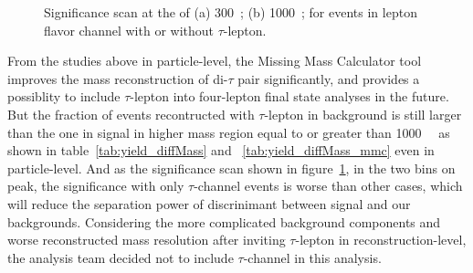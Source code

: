 \begin{figure}[!htbp]
\centering
{}
\caption{
Significance scan at the \mH of 
(a) 300~\gev;
(b) 1000~\gev;
for events in lepton flavor channel with or without $\tau$-lepton.
}
\label{fig:mmc_tau_signif}
\end{figure}

From the studies above in particle-level, the Missing Mass Calculator tool improves the mass reconstruction of di-$\tau$ pair significantly,
and provides a possiblity to include $\tau$-lepton into four-lepton final state analyses in the future.
But the fraction of events recontructed with $\tau$-lepton in background is still larger than the one in signal in higher mass region equal to or greater than 1000~\gev~ as shown in table~\ref{tab:yield_diffMass} and ~\ref{tab:yield_diffMass_mmc} even in particle-level.
And as the significance scan shown in figure~\ref{fig:mmc_tau_signif}, in the two \mfl bins on peak, the significance with only $\tau$-channel events is worse than other cases, which will reduce the separation power of \mfl discrinimant between signal and our backgrounds.
Considering the more complicated background components and worse reconstructed mass resolution after inviting $\tau$-lepton in reconstruction-level,
the analysis team decided not to include $\tau$-channel in this analysis.
